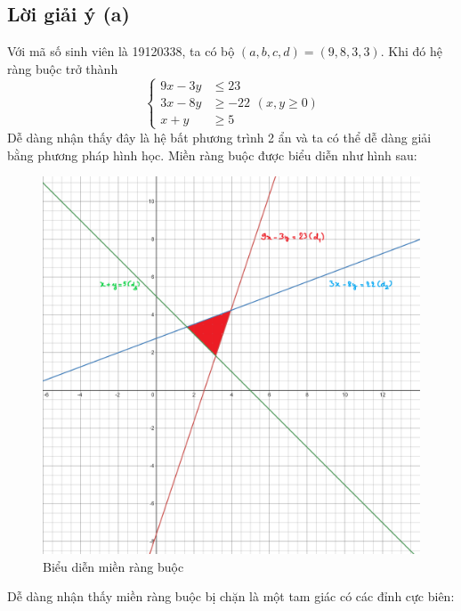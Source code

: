 \documentclass[12pt]{article}
\begin{document}
\subsection{Lời giải ý (a)}
Với mã số sinh viên là 19120338, ta có bộ $(a, b, c, d) = (9, 8, 3, 3)$. Khi đó hệ ràng buộc trở thành
\begin{equation}
\left\{ 
\begin{aligned}
9x - 3y &\leq 23 \\
3x - 8y &\geq -22 \\
x + y &\geq 5
\end{aligned}
\right.
(x, y \geq 0)
\end{equation}
Dễ dàng nhận thấy đây là hệ bất phương trình 2 ẩn và ta có thể dễ dàng giải bằng phương pháp hình học. Miền ràng buộc được biểu diễn như hình sau:
\begin{figure}[H]
    \centering
    \includegraphics[scale=.2]{img/zone.png}
    \caption{Biểu diễn miền ràng buộc}
\end{figure}
\noindent Dễ dàng nhận thấy miền ràng buộc bị chặn là một tam giác có các đỉnh cực biên:
\end{document}
